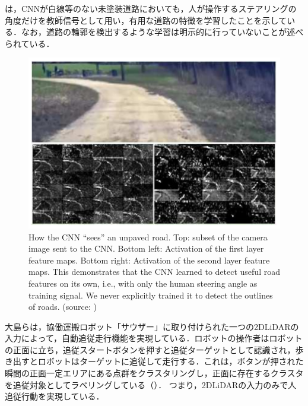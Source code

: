 \newpage

     は，CNNが白線等のない未塗装道路においても，人が操作するステアリングの角度だけを教師信号として用い，有用な道路の特徴を学習したことを示している．なお，道路の輪郭を検出するような学習は明示的に行っていないことが述べられている．

     \vspace{2cm}

     \begin{figure}[h]
          \centering
          \includegraphics[keepaspectratio, scale=0.80] {images/pdf/bojarski_CNN}
          \captionsetup{justification=raggedright} %
          \caption[How the CNN ``sees'' an unpaved road. Top: subset of the camera image sent to the CNN. Bottom left: Activation of the first layer feature maps. Bottom right: Activation of the second layer feature maps. This demonstrates that the CNN learned to detect useful road features on its own, i.e., with only the human steering angle as training signal. We never explicitly trained it to detect the outlines of roads.]{How the CNN ``sees'' an unpaved road. Top: subset of the camera image sent to the CNN. Bottom left: Activation of the first layer feature maps. Bottom right: Activation of the second layer feature maps. This demonstrates that the CNN learned to detect useful road features on its own, i.e., with only the human steering angle as training signal. We never explicitly trained it to detect the outlines of roads. (source: \cite{bojarski})}
          \label{Fig:bojarski_CNN}
     \end{figure}

\newpage

     大島ら\cite{doog}は，協働運搬ロボット「サウザー」に取り付けられた一つの2DLiDARの入力によって，自動追従走行機能を実現している．ロボットの操作者はロボットの正面に立ち，追従スタートボタンを押すと追従ターゲットとして認識され，歩き出すとロボットはターゲットに追従して走行する．これは，ボタンが押された瞬間の正面一定エリアにある点群をクラスタリングし，正面に存在するクラスタを追従対象としてラベリングしている（）．
     つまり，2DLiDARの入力のみで人追従行動を実現している．

